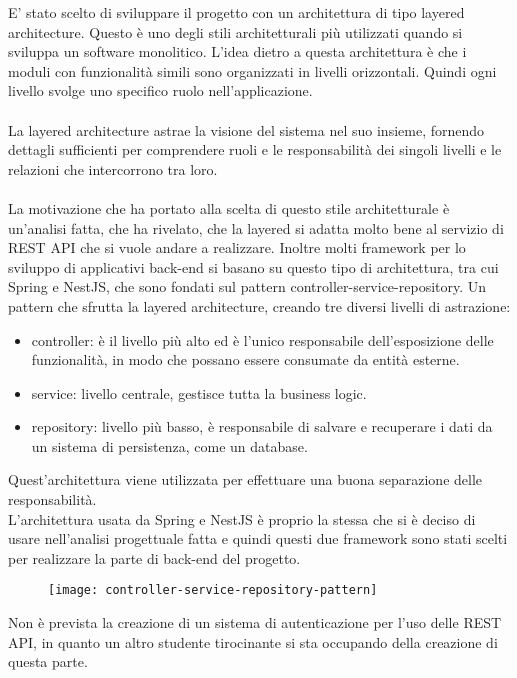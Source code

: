 E' stato scelto di sviluppare il progetto con un architettura di tipo layered architecture. Questo è uno
degli stili architetturali più utilizzati quando si sviluppa un software monolitico. L'idea dietro a 
questa architettura è che i moduli con funzionalità simili sono organizzati in livelli
orizzontali. Quindi ogni livello svolge uno specifico ruolo nell'applicazione.
\\\\
La layered architecture astrae la visione del sistema nel suo insieme, fornendo dettagli 
sufficienti per comprendere ruoli e le responsabilità dei singoli livelli e le relazioni
che intercorrono tra loro.
\\\\
La motivazione che ha portato alla scelta di questo stile architetturale è un'analisi fatta,
che ha rivelato, che la layered si adatta molto bene al servizio di REST API che
si vuole andare a realizzare. Inoltre molti framework per lo sviluppo di applicativi back-end si basano su questo tipo di architettura, tra cui
Spring e NestJS, che sono fondati sul pattern controller-service-repository. Un pattern
che sfrutta la layered architecture, creando tre diversi livelli di astrazione: 
\begin{itemize}
    \item controller: è il livello più alto ed è l'unico responsabile dell'esposizione delle
        funzionalità, in modo che possano essere consumate da entità esterne.
    \item service: livello centrale, gestisce tutta la business logic.
    \item repository: livello più basso, è responsabile di salvare e recuperare i dati da un
        sistema di persistenza, come un database.
\end{itemize}
\leavevmode\newline
Quest'architettura viene utilizzata per effettuare una buona separazione delle responsabilità.
\\
L'architettura usata da Spring e NestJS è proprio la stessa che si è deciso di usare nell'analisi progettuale fatta 
 e quindi questi due framework sono stati scelti per realizzare
la parte di back-end del progetto.
\leavevmode\newline
\begin{figure}[H]
    \centering
    \texttt{[image: controller-service-repository-pattern]}
\end{figure}
\leavevmode\newline
Non è prevista la creazione di un sistema di autenticazione per l'uso delle REST API, in quanto 
un altro studente tirocinante si sta occupando della creazione di questa parte.

